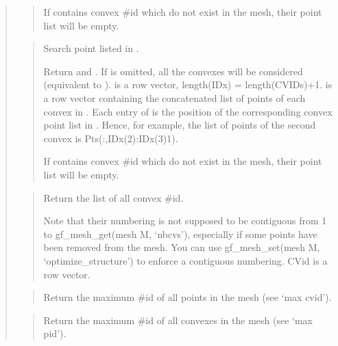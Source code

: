 \documentclass[a4paper,11pt,english]{sphinxmanual}
\begin{document}
\begin{quote}
\begin{quote}
If  contains convex \#id which do not exist in the mesh,
their point list will be empty.
\end{quote}

\begin{quote}

Search point listed in .

Return  and .
If  is omitted, all the convexes will be considered
(equivalent to ).  is a
row vector, length(IDx) = length(CVIDs)+1.  is a
row vector containing the concatenated list of points
of each convex in . Each entry of  is the position
of the corresponding convex point list in . Hence, for
example, the list of points of the second convex is
Pts(:,IDx(2):IDx(3)\sphinxhyphen{}1).

If  contains convex \#id which do not exist in the mesh,
their point list will be empty.
\end{quote}

\begin{quote}

Return the list of all convex \#id.

Note that their numbering is not supposed to be contiguous from
1 to gf\_mesh\_get(mesh M, ‘nbcvs’),
especially if some points have been removed from the mesh. You
can use gf\_mesh\_set(mesh M, ‘optimize\_structure’) to enforce a contiguous
numbering. CVid is a row vector.
\end{quote}

\begin{quote}

Return the maximum \#id of all points in the mesh (see ‘max cvid’).
\end{quote}

\begin{quote}

Return the maximum \#id of all convexes in the mesh (see ‘max pid’).
\end{quote}


\end{quote}
\end{document}
